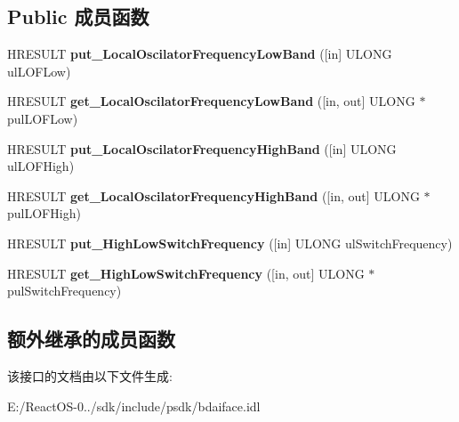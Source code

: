 \subsection*{Public 成员函数}
\begin{DoxyCompactItemize}
\item 
\mbox{\label{interface_i_b_d_a___l_n_b_info_ae3bccf48d20044c145262fad82029d54}} 
H\+R\+E\+S\+U\+LT {\bfseries put\+\_\+\+Local\+Oscilator\+Frequency\+Low\+Band} (\mbox{[}in\mbox{]} U\+L\+O\+NG ul\+L\+O\+F\+Low)
\item 
\mbox{\label{interface_i_b_d_a___l_n_b_info_af88884d1d5f1e5671884b0687b2fc5f6}} 
H\+R\+E\+S\+U\+LT {\bfseries get\+\_\+\+Local\+Oscilator\+Frequency\+Low\+Band} (\mbox{[}in, out\mbox{]} U\+L\+O\+NG $\ast$pul\+L\+O\+F\+Low)
\item 
\mbox{\label{interface_i_b_d_a___l_n_b_info_afec5c0efb744ecf846140ad907b2e53f}} 
H\+R\+E\+S\+U\+LT {\bfseries put\+\_\+\+Local\+Oscilator\+Frequency\+High\+Band} (\mbox{[}in\mbox{]} U\+L\+O\+NG ul\+L\+O\+F\+High)
\item 
\mbox{\label{interface_i_b_d_a___l_n_b_info_a8068205cb7f7cde1042b107cee8b66c4}} 
H\+R\+E\+S\+U\+LT {\bfseries get\+\_\+\+Local\+Oscilator\+Frequency\+High\+Band} (\mbox{[}in, out\mbox{]} U\+L\+O\+NG $\ast$pul\+L\+O\+F\+High)
\item 
\mbox{\label{interface_i_b_d_a___l_n_b_info_a56cd3060f742041f0f7e267cafa926ce}} 
H\+R\+E\+S\+U\+LT {\bfseries put\+\_\+\+High\+Low\+Switch\+Frequency} (\mbox{[}in\mbox{]} U\+L\+O\+NG ul\+Switch\+Frequency)
\item 
\mbox{\label{interface_i_b_d_a___l_n_b_info_af6144281bf8d0d4e0bdffea729d933c4}} 
H\+R\+E\+S\+U\+LT {\bfseries get\+\_\+\+High\+Low\+Switch\+Frequency} (\mbox{[}in, out\mbox{]} U\+L\+O\+NG $\ast$pul\+Switch\+Frequency)
\end{DoxyCompactItemize}
\subsection*{额外继承的成员函数}


该接口的文档由以下文件生成\+:\begin{DoxyCompactItemize}
\item 
E\+:/\+React\+O\+S-\/0../sdk/include/psdk/bdaiface.\+idl\end{DoxyCompactItemize}
